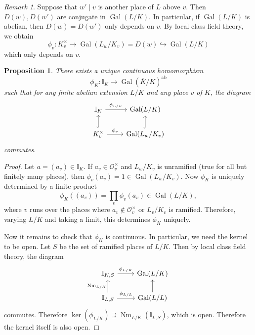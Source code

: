 \documentclass[leqno, openany]{memoir}
\newtheorem{prop}[thm]{Proposition}
\theoremstyle{definition}
\theoremstyle{remark}
\newtheorem{rmk}[thm]{Remark}
\theoremstyle{plain}
\theoremstyle{definition}
\theoremstyle{remark}
\newcommand{\I}{\mathbb{I}}
\newcommand{\mc}[1]{\mathcal{#1}}
\newcommand{\mr}[1]{\mathrm{#1}}
\newcommand{\ol}[1]{\overline{#1}}
\DeclareMathOperator{\Gal}{Gal}
\DeclareMathOperator{\Nm}{Nm}
\begin{document}
\begin{rmk} Suppose that $w' \mid v$ is another place of $L$ above $v$. Then
    $D(w), D(w')$ are conjugate in $\Gal(L/K)$. In particular, if $\Gal(L/K)$
    is abelian, then $D(w) = D(w')$ only depends on $v$. By local class field
    theory, we obtain \[ \phi_v \colon K_v^{\times} \to \Gal(L_w/K_v) = D(w)
    \hookrightarrow \Gal(L/K) \] which only depends on $v$.  \end{rmk}

\begin{prop} There exists a unique continuous homomorphism \[ \phi_K \colon
    \I_K \to {\Gal(\ol{K}/K)}^{\mr{ab}} \] such that for any finite abelian
    extension $L/K$ and any place $v$ of $K$, the diagram \begin{equation*}
        \begin{tikzcd} \I_K \ar{r}{\phi_{L/K}} & \Gal(L/K) \\ K_v^{\times}
        \ar{r}{\phi_v} \ar[hookrightarrow]{u} & \Gal(L_w/K_v)
    \ar[hookrightarrow]{u} \end{tikzcd} \end{equation*} commutes.  \end{prop}

\begin{proof} Let $a = (a_v) \in \I_K$. If $a_v \in \mc{O}_v^{\times}$ and
    $L_w/K_v$ is unramified (true for all but finitely many places), then
    $\phi_v(a_v) = 1 \in \Gal(L_w/K_v)$. Now $\phi_K$ is uniquely determined by
    a finite product \[ \phi_K((a_v)) = \prod_v \phi_v(a_v) \in \Gal(L/K), \]
    where $v$ runs over the places where $a_v \notin \mc{O}_v^{\times}$ or
    $L_v/K_v$ is ramified. Therefore, varying $L/K$ and taking a limit, this
    determines $\phi_K$ uniquely. 

    Now it remains to check that $\phi_K$ is continuous. In particular, we need
    the kernel to be open. Let $S$ be the set of ramified places of $L/K$. Then
    by local class field theory, the diagram \begin{equation*} \begin{tikzcd}
        \I_{K,S} \ar{r}{\phi_{L/K}} & \Gal(L/K) \\ \I_{L,S} \ar{u}{\Nm_{L/K}}
    \ar{r}{\phi_{L/L}} & \Gal(L/L) \ar{u} \end{tikzcd} \end{equation*}
    commutes. Therefore $\ker(\phi_{L/K}) \supseteq \Nm_{L/K} (\I_{L,S})$,
    which is open. Therefore the kernel itself is also open.  \end{proof}
\end{document}
